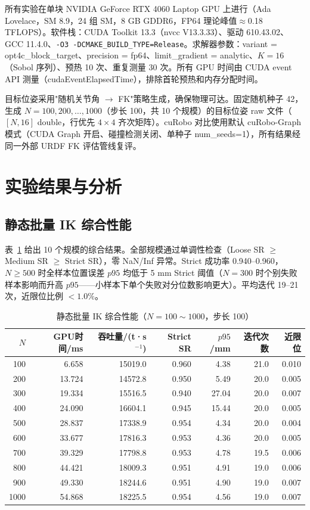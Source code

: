 \documentclass[twocolumn,a4paper,10pt]{ctexart}
\begin{document}
所有实验在单块 NVIDIA GeForce RTX 4060 Laptop GPU 上进行（Ada Lovelace，SM 8.9，24 组 SM，8 GB GDDR6，FP64 理论峰值$\approx$0.18 TFLOPS）。软件栈：CUDA Toolkit 13.3（nvcc V13.3.33）、驱动 610.43.02、GCC 11.4.0、\texttt{-O3 -DCMAKE\_BUILD\_TYPE=Release}。求解器参数：variant = opt4c\_block\_target、precision = fp64、limit\_gradient = analytic、$K=16$（Sobol 序列\cite{sobol1967}）、预热 10 次、重复测量 30 次。所有 GPU 时间由 CUDA event API 测量（cudaEventElapsedTime），排除首轮预热和内存分配时间。

目标位姿采用"随机关节角 $\to$ FK"策略生成，确保物理可达。固定随机种子 42，生成 $N=100,200,\dots,1000$（步长 100，共 10 个规模）的目标位姿 raw 文件（$[N,16]$ double，行优先 $4\times4$ 齐次矩阵）。cuRobo 对比使用默认 cuRobo-Graph 模式（CUDA Graph 开启、碰撞检测关闭、单种子 num\_seeds=1），所有结果经同一外部 URDF FK 评估管线复评。

\section{实验结果与分析}

\subsection{静态批量 IK 综合性能}

表~\ref{tab:static} 给出 10 个规模的综合结果。全部规模通过单调性检查（Loose SR $\ge$ Medium SR $\ge$ Strict SR），零 NaN/Inf 异常。Strict 成功率 0.940--0.960，$N\ge500$ 时全样本位置误差 $p95$ 均低于 5 mm Strict 阈值（$N=300$ 时个别失败样本影响而升高 $p95$——小样本下单个失败对分位数影响更大）。平均迭代 19--21 次，近限位比例 $<1.0\%$。

\begin{table}[tp]
\centering
\caption{静态批量 IK 综合性能（$N=100\sim1000$，步长 100）}
\label{tab:static}
\small
\begin{tabular}{rrrrrrr}
\toprule
$N$ & GPU时间/ms & 吞吐量/(t·s$^{-1}$) & Strict SR & $p95$/mm & 迭代次数 & 近限位\\
\midrule
100  & 6.658  & 15019.0 & 0.960 & 4.38 & 21.0 & 0.010\\
200  & 13.724 & 14572.8 & 0.950 & 5.49 & 20.0 & 0.005\\
300  & 19.334 & 15516.5 & 0.940 & 27.04 & 20.0 & 0.007\\
400  & 24.090 & 16604.1 & 0.945 & 15.44 & 20.0 & 0.005\\
500  & 28.837 & 17338.9 & 0.954 & 4.34 & 20.0 & 0.004\\
600  & 33.677 & 17816.3 & 0.953 & 4.36 & 20.0 & 0.005\\
700  & 39.329 & 17798.8 & 0.953 & 4.78 & 19.5 & 0.006\\
800  & 44.421 & 18009.3 & 0.951 & 4.91 & 19.0 & 0.006\\
900  & 49.330 & 18244.6 & 0.951 & 4.90 & 19.0 & 0.007\\
1000 & 54.868 & 18225.5 & 0.954 & 4.56 & 19.0 & 0.007\\
\bottomrule
\end{tabular}
\end{table}
\end{document}
